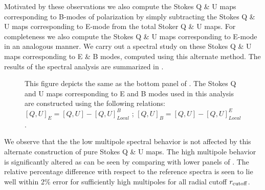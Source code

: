 Motivated by these observations we also compute the Stokes Q \& U maps corresponding to B-modes of polarization by simply subtracting the Stokes Q \& U maps corresponding to E-mode from the total Stoker Q \& U maps. For completeness we also compute the Stokes Q \& U maps corresponding to E-mode in an analogous manner. We carry out a spectral study on these Stokes Q \& U maps corresponding to E \& B modes, computed using this alternate method. The results of the spectral analysis are summarized in .
%
\begin{figure}[!t] 
\centering
\caption{This figure depicts the same as the bottom panel of . The Stokes Q and U maps corresponding to E and B modes used in this analysis are constructed using the following relations:  $[Q,U]_{E}=[Q,U]-[Q,U]_{Local}^B$ ; $[Q,U]_{B}=[Q,U]-[Q,U]_{Local}^{E}$.}
\label{fig:dbqu-spectra_rad_cutoff}
\end{figure}
%
We observe that the the low multipole spectral behavior is not affected by this alternate construction of pure Stokes Q \& U maps. The high multipole behavior is significantly altered as can be seen by comparing  with lower panels of . The relative percentage difference with respect to the reference spectra is seen to lie well within 2\% error for sufficiently high multipoles for all radial cutoff $r_{\rm cutoff}$.

